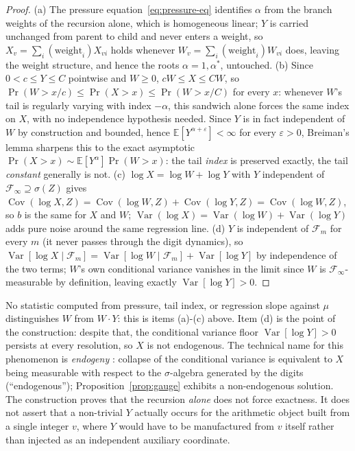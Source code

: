 \documentclass[11pt]{article}
\theoremstyle{definition}
\theoremstyle{remark}
\DeclareMathOperator{\Cov}{Cov}
\DeclareMathOperator{\Var}{Var}
\begin{document}
\begin{proof}
(a) The pressure equation~\eqref{eq:pressure-eq} identifies $\alpha$
from the branch weights of the recursion alone, which is homogeneous
linear; $Y$ is carried unchanged from parent to child and never enters
a weight, so $X_v=\sum_i(\text{weight}_i)X_{vi}$ holds whenever
$W_v=\sum_i(\text{weight}_i)W_{vi}$ does, leaving the weight structure,
and hence the roots $\alpha=1,\alpha^\ast$, untouched. (b) Since
$0<c\le Y\le C$ pointwise and $W\ge0$, $cW\le X\le CW$, so
$\Pr(W>x/c)\le\Pr(X>x)\le\Pr(W>x/C)$ for every $x$: whenever $W$'s tail
is regularly varying with index $-\alpha$, this sandwich alone forces
the same index on $X$, with no independence hypothesis needed. Since
$Y$ is in fact independent of $W$ by construction and bounded, hence
$\mathbb{E}[Y^{\alpha+\varepsilon}]<\infty$ for every $\varepsilon>0$,
Breiman's lemma \cite{Breiman1965} sharpens this to the exact
asymptotic $\Pr(X>x)\sim\mathbb{E}[Y^\alpha]\Pr(W>x)$: the tail
\emph{index} is preserved exactly, the tail \emph{constant} generally
is not. (c) $\log X=\log W+\log Y$ with $Y$ independent of
$\mathcal{F}_\infty\supseteq\sigma(Z)$ gives
$\Cov(\log X,Z)=\Cov(\log W,Z)+\Cov(\log Y,Z)=\Cov(\log W,Z)$, so $b$
is the same for $X$ and $W$; $\Var(\log X)=\Var(\log W)+\Var(\log Y)$
adds pure noise around the same regression line. (d) $Y$ is
independent of $\mathcal{F}_m$ for every $m$ (it never passes through
the digit dynamics), so $\Var[\log X\mid\mathcal{F}_m]=\Var[\log
W\mid\mathcal{F}_m]+\Var[\log Y]$ by independence of the two terms;
$W$'s own conditional variance vanishes in the limit since $W$ is
$\mathcal{F}_\infty$-measurable by definition, leaving exactly
$\Var[\log Y]>0$.
\end{proof}

No statistic computed from pressure, tail index, or regression slope
against $\mu$ distinguishes $W$ from $W\cdot Y$: this is items
(a)-(c) above. Item (d) is the point of the construction: despite
that, the conditional variance floor $\Var[\log Y]>0$ persists at
every resolution, so $X$ is not endogenous.
The technical name for this phenomenon is \emph{endogeny}
\cite{AldousBandyopadhyay2005}: collapse of the conditional variance is
equivalent to $X$ being measurable with respect to the $\sigma$-algebra
generated by the digits (``endogenous''); Proposition~\ref{prop:gauge}
exhibits a non-endogenous solution. The construction proves that the
recursion \emph{alone} does not force exactness. It does not assert
that a non-trivial $Y$ actually occurs for the arithmetic object built
from a single integer $v$, where $Y$ would have to be manufactured from
$v$ itself rather than injected as an independent auxiliary coordinate.
\end{document}
